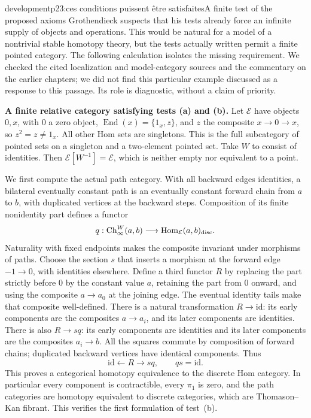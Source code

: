 \begin{dcomment}{development}{p23:ces conditions puissent être satisfaites}{A finite test of the proposed axioms}
Grothendieck suspects that his tests already force an infinite supply of objects and operations. This would be natural for a model of a nontrivial stable homotopy theory, but the tests actually written permit a finite pointed category. The following calculation isolates the missing requirement. We checked the cited localization and model-category sources and the commentary on the earlier chapters; we did not find this particular example discussed as a response to this passage. Its role is diagnostic, without a claim of priority.

\textbf{A finite relative category satisfying tests (a) and (b).}\ours
Let $\mathcal E$ have objects $0,x$, with $0$ a zero object, $\operatorname{End}(x)=\{1_x,z\}$, and $z$ the composite $x\to0\to x$, so $z^2=z\ne1_x$. All other Hom sets are singletons. This is the full subcategory of pointed sets on a singleton and a two-element pointed set. Take $W$ to consist of identities. Then $\mathcal E[W^{-1}]=\mathcal E$, which is neither empty nor equivalent to a point.

We first compute the actual path category. With all backward edges identities, a bilateral eventually constant path is an eventually constant forward chain from $a$ to $b$, with duplicated vertices at the backward steps. Composition of its finite nonidentity part defines a functor
\[
 q:\mathrm{Ch}_\infty^W(a,b)\longrightarrow
       \operatorname{Hom}_{\mathcal E}(a,b)_{\mathrm{disc}}.
\]
Naturality with fixed endpoints makes the composite invariant under morphisms of paths. Choose the section $s$ that inserts a morphism at the forward edge $-1\to0$, with identities elsewhere. Define a third functor $R$ by replacing the part strictly before $0$ by the constant value $a$, retaining the part from $0$ onward, and using the composite $a\to a_0$ at the joining edge. The eventual identity tails make that composite well-defined. There is a natural transformation $R\to\mathrm{id}$: its early components are the composites $a\to a_i$, and its later components are identities. There is also $R\to sq$: its early components are identities and its later components are the composites $a_i\to b$. All the squares commute by composition of forward chains; duplicated backward vertices have identical components. Thus
\[
 \mathrm{id}\longleftarrow R\longrightarrow sq,
 \qquad qs=\mathrm{id}.
\]
This proves a categorical homotopy equivalence to the discrete Hom category. In particular every component is contractible, every $\pi_1$ is zero, and the path categories are homotopy equivalent to discrete categories, which are Thomason--Kan fibrant. This verifies the first formulation of test~(b).


\end{dcomment}

